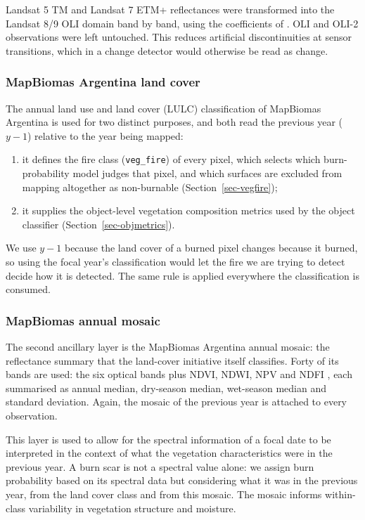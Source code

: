 \documentclass[11pt,a4paper]{article}
\begin{document}
Landsat 5 TM and
Landsat 7 ETM+ reflectances were transformed into the Landsat 8/9 OLI domain band by band, using
the coefficients of \textcite{roy2016harmonization}. OLI and OLI-2 observations were left
untouched. This reduces artificial discontinuities at sensor transitions, which in a change
detector would otherwise be read as change.

\subsubsection{MapBiomas Argentina land cover}

The annual land use and land cover (LULC) classification of MapBiomas Argentina
\parencite{mapbiomasarg} is used for two distinct purposes, and both read the previous year
(\(y-1\)) relative to the year being mapped:

\begin{enumerate}
  \item it defines the fire class (\texttt{veg\_fire}) of every pixel, which selects which
        burn-probability model judges that pixel, and which surfaces are excluded from mapping
        altogether as non-burnable (Section~\ref{sec-vegfire});
  \item it supplies the object-level vegetation composition metrics used by the object classifier
        (Section~\ref{sec-objmetrics}).
\end{enumerate}

We use \(y-1\) because the land cover of a burned pixel changes because it burned, so
using the focal year's classification would let the fire we are trying to detect decide how it is
detected. The same rule is applied everywhere the classification is consumed.

\subsubsection{MapBiomas annual mosaic}

The second ancillary layer is the MapBiomas Argentina annual mosaic: the reflectance summary that
the land-cover initiative itself classifies. Forty of its bands are used: the six optical bands
plus NDVI, NDWI, NPV and NDFI \parencite{souza2005ndfi}, each summarised as annual median,
dry-season median, wet-season median and standard deviation. Again, the mosaic of the previous
year is attached to every observation.

This layer is used to allow for the spectral information of a focal date to be interpreted
in the context of what the vegetation characteristics were in the previous year. 
A burn scar is not a spectral
value alone: we assign burn probability based on its spectral data but considering what it was
in the previous year, from the land cover class and from this mosaic. The mosaic informs 
within-class variability in vegetation structure and moisture.
\end{document}
